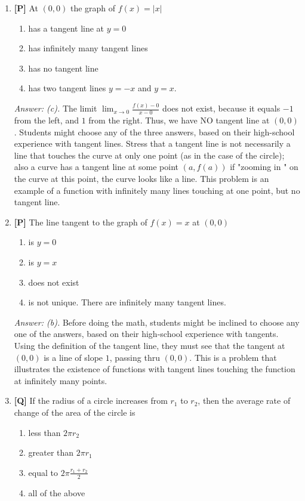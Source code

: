 \documentclass[12pt]{article}
\begin{document}
\begin{enumerate}

\item {\bf [P]} At $(0,0)$ the graph of $f(x)=|x|$ 
\begin{enumerate}
\item has a tangent line at $y=0$
\item has infinitely many tangent lines
\item has no tangent line
\item has two tangent lines $y=-x$ and $y=x$.
\end{enumerate}

{\it Answer: (c).} The limit $\displaystyle{\lim_{x\rightarrow 0}\frac{f(x)-0}{x-0}}$ does not exist, because it equals $-1$ from the left, and $1$ from the right. Thus, we have NO tangent line at $(0,0)$. Students might choose any of the three answers, based on their high-school experience with tangent lines. Stress that a tangent line is not necessarily a line that touches the curve at only one point (as in the case of the circle); also a curve has a tangent line at some point $(a, f(a))$ if "zooming in
" on the curve at this point, the curve looks like a line. This problem is an example of a function with infinitely many lines touching at one point, but no tangent line.

\bigskip

\item {\bf [P]} The line tangent to the graph of 
$f(x)=x$ at $(0,0)$ 
\begin{enumerate}
\item is $y=0$
\item is $y=x$
\item does not exist
\item is not unique.  There are infinitely many tangent lines.
\end{enumerate}

{\it Answer: (b).} Before doing the math, students might be inclined to choose any one of the answers, based on their high-school experience with tangents. Using the definition of the tangent line, they must see that the tangent at $(0,0)$ is a line of slope $1$, passing thru $(0,0)$. This is a problem that illustrates the existence of functions with tangent lines touching the function at infinitely many points.

\bigskip

\item {\bf [Q]} If the radius of a circle increases from $r_1$ to $r_2$, then the average rate of change of the area of the circle is	
\begin{enumerate}
\item less than $2\pi r_2$
\item greater than $2\pi r_1$
\item equal to $2\pi \frac{r_1+r_2}{2}$
\item all of the above
\end{enumerate}


\end{enumerate}
\end{document}
